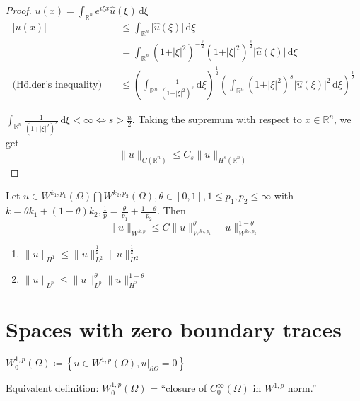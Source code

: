 \documentclass{report}
\begin{document}
\begin{proof}
    \(u(x) = \int_{\mathbb{R}^{n}} e^{i\xi x} \hat{u}(\xi) \,\mathrm{d}\xi \)
    \begin{align*}
        \vert u(x) \vert &\leq \int_{\mathbb{R}^{n}} \vert \hat{u}(\xi) \vert \,\mathrm{d}\xi \\
        &= \int_{\mathbb{R}^{n}} \left(1+\vert \xi \vert ^{2} \right)^{-\frac{s}{2}} \left(1+\vert \xi \vert ^{2} \right)^{\frac{s}{2}} \vert \hat{u}(\xi) \vert \,\mathrm{d}\xi \\
        \text{(Hölder's inequality)} \quad &\leq \left(\int_{\mathbb{R}^{n}} \frac{1}{\left(1+\vert \xi \vert ^{2}  \right)^{s}} \,\mathrm{d}\xi \right)^{\frac{1}{2}} \left(\int_{\mathbb{R}^{n}} \left(1+\vert \xi \vert ^{2} \right)^{s} \vert \hat{u}(\xi) \vert^{2} \,\mathrm{d}\xi \right)^{\frac{1}{2}}
    \end{align*} 

    \(\int_{\mathbb{R}^{n}} \frac{1}{\left(1+\vert \xi \vert ^{2}  \right)^{s}} \,\mathrm{d}\xi < \infty \iff s>\frac{n}{2}\).
    Taking the supremum with respect to \(x \in \mathbb{R}^{n}\), we get
    \[\|u\|_{C(\mathbb{R}^{n})} \leq C_{s}\|u\|_{H^{s}(\mathbb{R}^{n})}\]   
\end{proof}

{
    Let \(u \in W^{k_1, p_1}(\Omega) \bigcap W^{k_2, p_2}(\Omega), \theta \in [0,1], 1\leq p_1, p_2 \leq \infty\) with \(k = \theta k_1 + (1-\theta) k_2, \frac{1}{p} = \frac{\theta}{p_1} + \frac{1-\theta}{p_2} \). Then 
    \[
        \|u\|_{W^{k, p}} \leq C\|u\|_{W^{k_1, p_1}}^{\theta} \|u\|_{W^{k_2, p_2}}^{1-\theta}
    \]
}

{
    \begin{enumerate}
        \item \(\|u\|_{H^{1}} \leq \|u\|_{L^{2}}^{\frac{1}{2}} \|u\|_{H^{2}}^{\frac{1}{2}}\)
        \item \(\|u\|_{L^{p}} \leq \|u\|_{L^{p}}^{\theta} \|u\|_{H^{2}}^{1-\theta}\) 
    \end{enumerate}
}

\section{Spaces with zero boundary traces}
\dfn{}
{
    \(W^{1, p}_{0}(\Omega) \coloneqq \left\{u \in W^{1, p}(\Omega), \left. u \right|_{\partial \Omega} = 0\right\} \)

    Equivalent definition: \(W^{1, p}_{0}(\Omega)\) = ``closure of \(C_{0}^{\infty}(\Omega)\) in \(W^{1, p}\) norm.''
}
\end{document}
